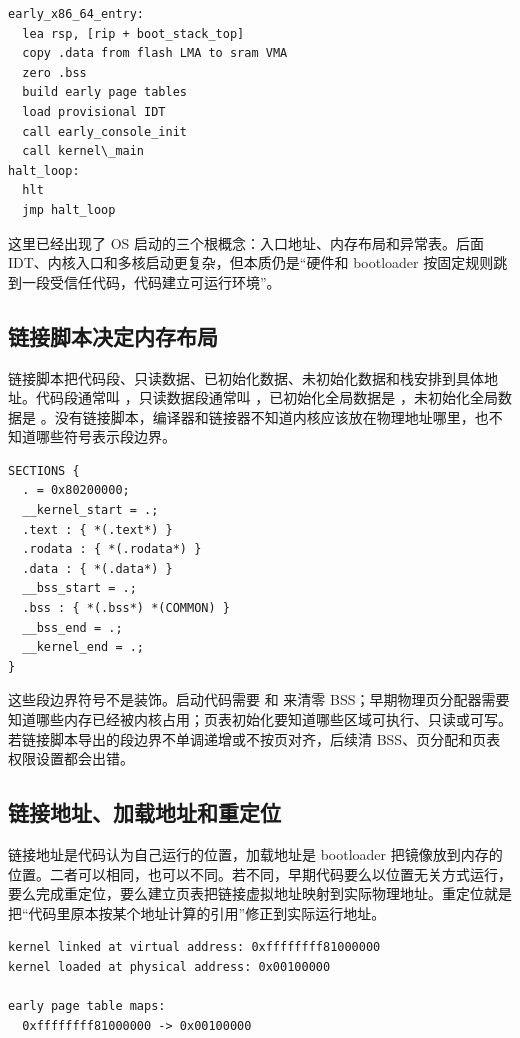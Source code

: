 \begin{lstlisting}
early_x86_64_entry:
  lea rsp, [rip + boot_stack_top]
  copy .data from flash LMA to sram VMA
  zero .bss
  build early page tables
  load provisional IDT
  call early_console_init
  call kernel\_main
halt_loop:
  hlt
  jmp halt_loop
\end{lstlisting}

这里已经出现了 OS 启动的三个根概念：入口地址、内存布局和异常表。后面 IDT、内核入口和多核启动更复杂，但本质仍是“硬件和 bootloader 按固定规则跳到一段受信任代码，代码建立可运行环境”。

\subsection{链接脚本决定内存布局}

链接脚本把代码段、只读数据、已初始化数据、未初始化数据和栈安排到具体地址。代码段通常叫 ，只读数据段通常叫 ，已初始化全局数据是 ，未初始化全局数据是 。没有链接脚本，编译器和链接器不知道内核应该放在物理地址哪里，也不知道哪些符号表示段边界。

\begin{lstlisting}
SECTIONS {
  . = 0x80200000;
  __kernel_start = .;
  .text : { *(.text*) }
  .rodata : { *(.rodata*) }
  .data : { *(.data*) }
  __bss_start = .;
  .bss : { *(.bss*) *(COMMON) }
  __bss_end = .;
  __kernel_end = .;
}
\end{lstlisting}

\begin{warningbox}
这些段边界符号不是装饰。启动代码需要  和  来清零 BSS；早期物理页分配器需要  知道哪些内存已经被内核占用；页表初始化要知道哪些区域可执行、只读或可写。若链接脚本导出的段边界不单调递增或不按页对齐，后续清 BSS、页分配和页表权限设置都会出错。
\end{warningbox}

\subsection{链接地址、加载地址和重定位}

链接地址是代码认为自己运行的位置，加载地址是 bootloader 把镜像放到内存的位置。二者可以相同，也可以不同。若不同，早期代码要么以位置无关方式运行，要么完成重定位，要么建立页表把链接虚拟地址映射到实际物理地址。重定位就是把“代码里原本按某个地址计算的引用”修正到实际运行地址。

\begin{lstlisting}
kernel linked at virtual address: 0xffffffff81000000
kernel loaded at physical address: 0x00100000

early page table maps:
  0xffffffff81000000 -> 0x00100000
\end{lstlisting}

